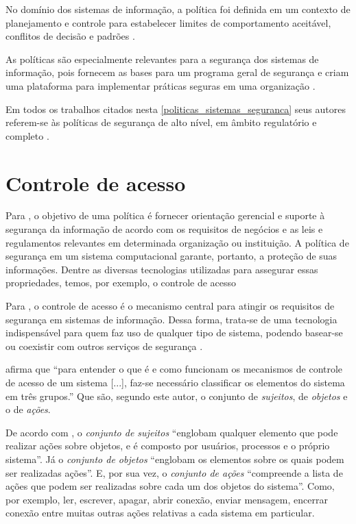 No domínio dos sistemas de informação, a política foi definida em um contexto de planejamento e controle para estabelecer limites de comportamento aceitável, conflitos de decisão e padrões \cite{davis_management_1984}. 

As políticas são especialmente relevantes para a segurança dos sistemas de informação, pois fornecem as bases para um programa geral de segurança e criam uma plataforma para implementar práticas seguras em uma organização \cite{von_solms_policies_2004}. 

Em todos os trabalhos citados nesta \autoref{politicas_sistemas_seguranca} seus autores referem-se às políticas de segurança de alto nível, em âmbito regulatório e completo \cite{monteiro_adocao_2017}.

\section{Controle de acesso}

Para , o objetivo de uma política é fornecer orientação gerencial e suporte à segurança da informação de acordo com os requisitos de negócios e as leis e regulamentos relevantes em determinada organização ou instituição. A política de segurança em um sistema computacional garante, portanto, a proteção de suas informações. Dentre as diversas tecnologias utilizadas para assegurar essas propriedades, temos, por exemplo, o controle de acesso \cite{sarkis:artigo:2016}

Para  , o controle de acesso é o mecanismo central para atingir os requisitos de segurança em  sistemas  de  informação. Dessa forma,  trata-se  de  uma  tecnologia indispensável para quem faz uso de qualquer tipo de sistema, podendo basear-se ou coexistir com outros serviços de segurança \cite{sandhu:1996}.

 afirma que ``para entender o que é e como funcionam os mecanismos de controle de acesso de um sistema [...], faz-se necessário classificar os elementos do sistema em três grupos.'' Que são, segundo este autor, o conjunto de \textit{sujeitos}, de \textit{objetos} e o de \textit{ações}.

De acordo com , o \textit{conjunto de sujeitos} ``englobam qualquer elemento que pode realizar ações sobre objetos, e é composto por usuários, processos e o próprio sistema''. Já o \textit{conjunto de objetos} ``englobam os elementos sobre os quais podem ser realizadas ações''. E, por sua vez, o \textit{conjunto de ações} ``compreende a lista de ações que podem ser realizadas sobre cada um dos objetos do sistema''. Como, por exemplo, ler, escrever, apagar, abrir conexão, enviar mensagem, encerrar conexão entre muitas outras ações relativas a cada sistema em particular.

